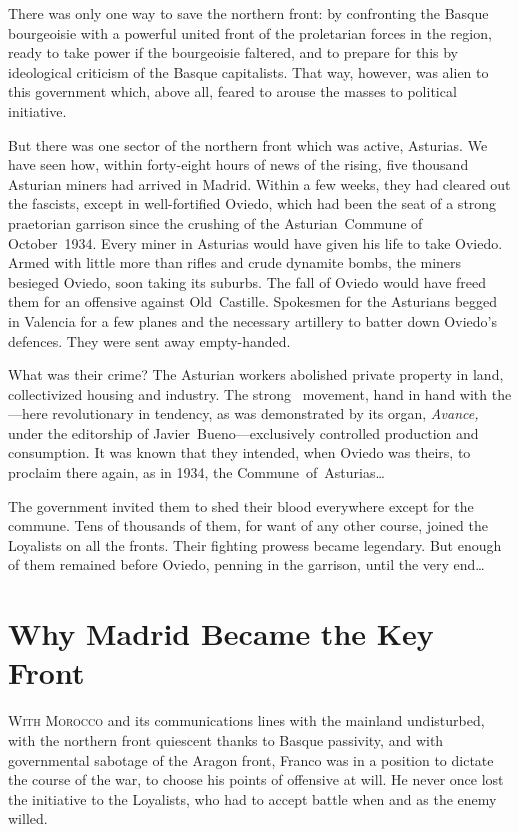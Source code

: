 There was only one way to save the northern front: by confronting the Basque bourgeoisie with a powerful united front of the proletarian forces in the region, ready to take power if the bourgeoisie faltered, and to prepare for this by ideological criticism of the Basque capitalists. That way, however, was alien to this government which, above all, feared to arouse the masses to political initiative.

\indexCNT\indexUGT{}
But there was one sector of the northern front which was active, Asturias. We have seen how, within forty-eight hours of news of the rising, five thousand Asturian miners had arrived in Madrid. Within a few weeks, they had cleared out the fascists, except in well-fortified Oviedo, which had been the seat of a strong praetorian garrison since the crushing of the Asturian~Commune of October~1934. Every miner in Asturias would have given his life to take Oviedo. Armed with little more than rifles and crude dynamite bombs, the miners besieged Oviedo, soon taking its suburbs. The fall of Oviedo would have freed them for an offensive against Old~Castille. Spokesmen for the Asturians begged in Valencia for a few planes and the necessary artillery to batter down Oviedo’s defences. They were sent away empty-handed.

What was their crime? The Asturian workers abolished private property in land, collectivized housing and industry. The strong \CNT\ movement, hand in hand with the \UGT---here revolutionary in tendency, as was demonstrated by its organ, \emph{Avance,} under the editorship of Javier~Bueno---exclusively controlled production and consumption. It was known that they intended, when Oviedo was theirs, to proclaim there again, as in 1934, the Commune~of~Asturias\dots

The government invited them to shed their blood everywhere except for the commune. Tens of thousands of them, for want of any other course, joined the Loyalists on all the fronts. Their fighting prowess became legendary. But enough of them remained before Oviedo, penning in the garrison, until the very end\dots

\section{Why Madrid Became the Key Front}

\textsc{With Morocco} and its communications lines with the mainland undisturbed, with the northern front quiescent thanks to Basque passivity, and with governmental sabotage of the Aragon front, Fran\-co was in a position to dictate the course of the war, to choose his points of offensive at will. He never once lost the initiative to the Loyalists, who had to accept battle when and as the enemy willed.

